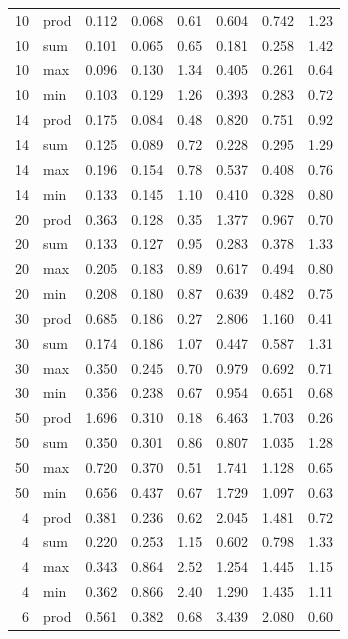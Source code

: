 \documentclass[11pt]{article}
\begin{document}
\begin{table}[H]
\begin{tabular}{@{}rlrrrrrr@{}}
        10 & prod & 0.112 & 0.068 & 0.61 & 0.604 & 0.742 & 1.23 \\
        10 & sum & 0.101 & 0.065 & 0.65 & 0.181 & 0.258 & 1.42 \\
        10 & max & 0.096 & 0.130 & 1.34 & 0.405 & 0.261 & 0.64 \\
        10 & min & 0.103 & 0.129 & 1.26 & 0.393 & 0.283 & 0.72 \\
        14 & prod & 0.175 & 0.084 & 0.48 & 0.820 & 0.751 & 0.92 \\
        14 & sum & 0.125 & 0.089 & 0.72 & 0.228 & 0.295 & 1.29 \\
        14 & max & 0.196 & 0.154 & 0.78 & 0.537 & 0.408 & 0.76 \\
        14 & min & 0.133 & 0.145 & 1.10 & 0.410 & 0.328 & 0.80 \\
        20 & prod & 0.363 & 0.128 & 0.35 & 1.377 & 0.967 & 0.70 \\
        20 & sum & 0.133 & 0.127 & 0.95 & 0.283 & 0.378 & 1.33 \\
        20 & max & 0.205 & 0.183 & 0.89 & 0.617 & 0.494 & 0.80 \\
        20 & min & 0.208 & 0.180 & 0.87 & 0.639 & 0.482 & 0.75 \\
        30 & prod & 0.685 & 0.186 & 0.27 & 2.806 & 1.160 & 0.41 \\
        30 & sum & 0.174 & 0.186 & 1.07 & 0.447 & 0.587 & 1.31 \\
        30 & max & 0.350 & 0.245 & 0.70 & 0.979 & 0.692 & 0.71 \\
        30 & min & 0.356 & 0.238 & 0.67 & 0.954 & 0.651 & 0.68 \\
        50 & prod & 1.696 & 0.310 & 0.18 & 6.463 & 1.703 & 0.26 \\
        50 & sum & 0.350 & 0.301 & 0.86 & 0.807 & 1.035 & 1.28 \\
        50 & max & 0.720 & 0.370 & 0.51 & 1.741 & 1.128 & 0.65 \\
        50 & min & 0.656 & 0.437 & 0.67 & 1.729 & 1.097 & 0.63 \\
        4 & prod & 0.381 & 0.236 & 0.62 & 2.045 & 1.481 & 0.72 \\
        4 & sum & 0.220 & 0.253 & 1.15 & 0.602 & 0.798 & 1.33 \\
        4 & max & 0.343 & 0.864 & 2.52 & 1.254 & 1.445 & 1.15 \\
        4 & min & 0.362 & 0.866 & 2.40 & 1.290 & 1.435 & 1.11 \\
        6 & prod & 0.561 & 0.382 & 0.68 & 3.439 & 2.080 & 0.60 \\

\end{tabular}
\end{table}
\end{document}

